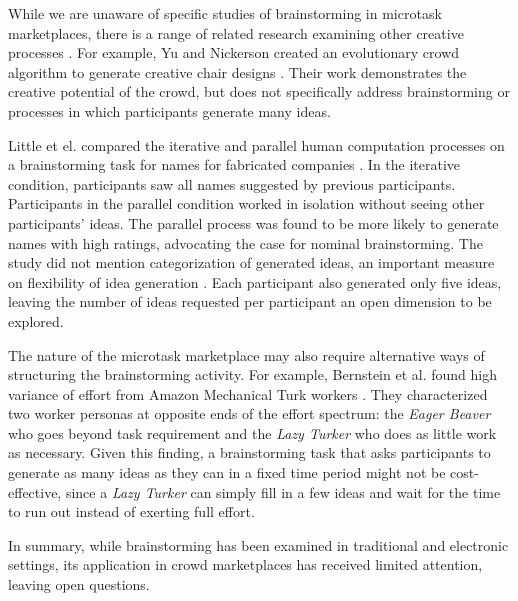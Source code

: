 While we are unaware of specific studies of brainstorming in microtask marketplaces, there is a range of related research examining other creative processes \cite{lewis2011affective, kittur2011crowdforge, Zhang:2012:HCT:2207676.2207708}. For example, Yu and Nickerson created an evolutionary crowd algorithm to generate creative chair designs \cite{yu_cooks_2011}. Their work demonstrates the creative potential of the crowd, but does not specifically address brainstorming or processes in which participants generate many ideas. 

Little et el. compared the iterative and parallel human computation processes on a brainstorming task for names for fabricated companies \cite{little2010exploring}. In the iterative condition, participants saw all names suggested by previous participants. Participants in the parallel condition worked in isolation without seeing other participants' ideas. The parallel process was found to be more likely to generate names with high ratings, advocating the case for nominal brainstorming. The study did not mention categorization of generated ideas, an important measure on flexibility of idea generation \cite{lewis2011affective, nijstad_how_2006, finke1992creative, shah2003metrics}. Each participant also generated only five ideas, leaving the number of ideas requested per participant an open dimension to be explored.

The nature of the microtask marketplace may also require alternative ways of structuring the brainstorming activity.
For example, Bernstein et al. found high variance of effort from Amazon Mechanical Turk workers \cite{soylent}. They characterized two worker personas at opposite ends of the effort spectrum: the {\em Eager Beaver\/} who goes beyond task requirement and the {\em Lazy Turker\/} who does as little work as necessary. Given this finding, a brainstorming task that asks participants to generate as many ideas as they can in a fixed time period might not be cost-effective, since a {\em Lazy Turker\/} can simply fill in a few ideas and wait for the time to run out instead of exerting full effort.




In summary, while brainstorming has been examined in traditional and electronic settings, its application in crowd marketplaces has received limited attention, leaving open questions.

